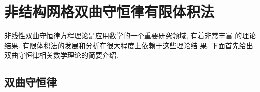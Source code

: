 \chapter{非结构网格双曲守恒律有限体积法}
\label{chap:fvm}



非线性双曲守恒律方程理论是应用数学的一个重要研究领域, 有着非常丰富
的理论结果. 有限体积法的发展和分析在很大程度上依赖于这些理论结
果. 下面首先给出双曲守恒律相关数学理论的简要介绍.

\section{双曲守恒律}
\label{sec:hyperbolic-conservation-law}



